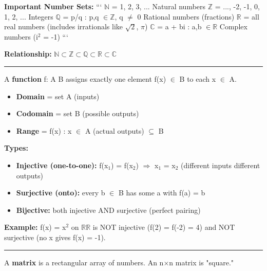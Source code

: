 \documentclass[12pt,a4paper,openany]{book}
\begin{document}
\begin{tcolorbox}[colback=warningbg!30,colframe=warningborder,title=\textbf{Important -- Exam Alert},breakable,boxrule=1.5pt]
\textbf{Important Number Sets:}
```
$\mathbb{N}$ = {1, 2, 3, ...}           Natural numbers
$\mathbb{Z}$ = {..., -2, -1, 0, 1, 2, ...} Integers
$\mathbb{Q}$ = {p/q : p,q $\in\mathbb{Z}$, q $\neq$ 0}   Rational numbers (fractions)
$\mathbb{R}$ = all real numbers           (includes irrationals like $\sqrt{2}$, $\pi$)
$\mathbb{C}$ = {a + bi : a,b $\in\mathbb{R}$}        Complex numbers (i$^2$ = -1)
```
\end{tcolorbox}

\textbf{Relationship:} $\mathbb{N}\subset\mathbb{Z}\subset\mathbb{Q}\subset\mathbb{R}\subset\mathbb{C}$

\bigskip\noindent\rule{\textwidth}{0.4pt}\bigskip


A \textbf{function} f: A  B assigns exactly one element f(x) $\in$ B to each x $\in$ A.

\begin{itemize}[leftmargin=*]
  \item \textbf{Domain} = set A (inputs)
  \item \textbf{Codomain} = set B (possible outputs)  
  \item \textbf{Range} = {f(x) : x $\in$ A} (actual outputs) $\subseteq$ B
\end{itemize}

\textbf{Types:}
\begin{itemize}[leftmargin=*]
  \item \textbf{Injective (one-to-one):} f(x$_1$) = f(x$_2$) $\Longrightarrow$ x$_1$ = x$_2$ (different inputs  different outputs)
  \item \textbf{Surjective (onto):} every b $\in$ B has some a with f(a) = b
  \item \textbf{Bijective:} both injective AND surjective (perfect pairing)
\end{itemize}

\begin{tcolorbox}[colback=examplebg!30,colframe=exampleborder,title=\textbf{Worked Example},breakable,boxrule=1pt]
\textbf{Example:} f(x) = x$^2$ on $\mathbb{R}\mathbb{R}$ is NOT injective (f(2) = f(-2) = 4) and NOT surjective (no x gives f(x) = -1).
\end{tcolorbox}

\bigskip\noindent\rule{\textwidth}{0.4pt}\bigskip


A \textbf{matrix} is a rectangular array of numbers. An n$\times$n matrix is "square."
\end{document}
